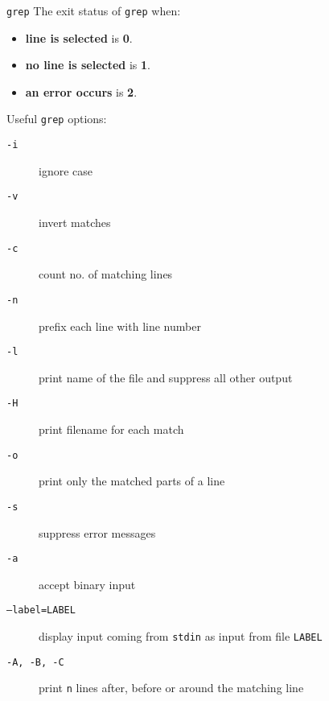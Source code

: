 \documentclass[11pt]{beamer}
\begin{document}
			\begin{frame}[t, fragile]{\texttt{grep}}
				The exit status of \texttt{grep} when:
				\begin{itemize}
					\item \textbf{line is selected} is \textbf{0}.
					\item \textbf{no line is selected} is \textbf{1}.
					\item \textbf{an error occurs} is \textbf{2}.
				\end{itemize}
				Useful \texttt{grep} options:
				\begin{description}
					\item[ \texttt{-i}] ignore case
					\item[ \texttt{-v}] invert matches
					\item[ \texttt{-c}] count no. of matching lines
					\item[ \texttt{-n}] prefix each line with line number
					\item[ \texttt{-l}] print name of the file and suppress all other output
					\item[ \texttt{-H}] print filename for each match
					\item[ \texttt{-o}] print only the matched parts of a line
					\item[ \texttt{-s}] suppress error messages
					\item[ \texttt{-a} ] accept binary input
					\item[ \texttt{--label=LABEL}] display input coming from \texttt{stdin} as input from file \texttt{LABEL}
					\item[ \texttt{-A, -B, -C}] print \texttt{n} lines after, before or around the matching line
				\end{description}
			\end{frame}
\end{document}
